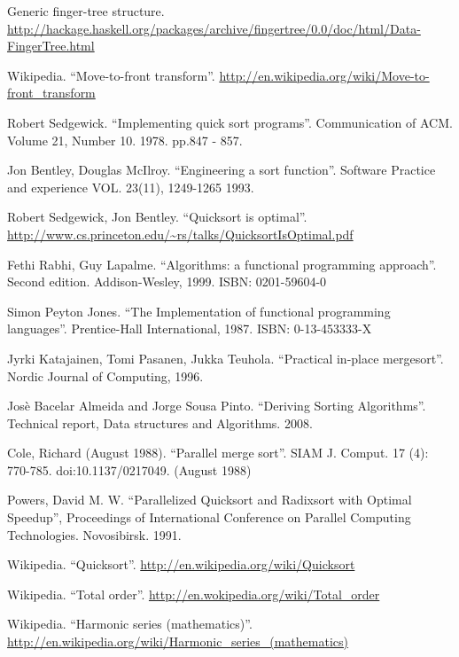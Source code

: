 \documentclass[b5paper]{ctexart}
\begin{document}
\begin{thebibliography}{99}
Generic finger-tree structure. \url{http://hackage.haskell.org/packages/archive/fingertree/0.0/doc/html/Data-FingerTree.html}

Wikipedia. ``Move-to-front transform''. \url{http://en.wikipedia.org/wiki/Move-to-front_transform}


Robert Sedgewick. ``Implementing quick sort programs''. Communication of ACM. Volume 21, Number 10. 1978. pp.847 - 857.

Jon Bentley, Douglas McIlroy. ``Engineering a sort function''. Software Practice and experience VOL. 23(11), 1249-1265 1993.

Robert Sedgewick, Jon Bentley. ``Quicksort is optimal''. \url{http://www.cs.princeton.edu/~rs/talks/QuicksortIsOptimal.pdf}

Fethi Rabhi, Guy Lapalme. ``Algorithms: a functional programming approach''. Second edition. Addison-Wesley, 1999. ISBN: 0201-59604-0

Simon Peyton Jones. ``The Implementation of functional programming languages''. Prentice-Hall International, 1987. ISBN: 0-13-453333-X

Jyrki Katajainen, Tomi Pasanen, Jukka Teuhola. ``Practical in-place mergesort''. Nordic Journal of Computing, 1996.

Jos\`{e} Bacelar Almeida and Jorge Sousa Pinto. ``Deriving Sorting Algorithms''. Technical report, Data structures and Algorithms. 2008.

Cole, Richard (August 1988). ``Parallel merge sort''. SIAM J. Comput. 17 (4): 770-785. doi:10.1137/0217049. (August 1988)

Powers, David M. W. ``Parallelized Quicksort and Radixsort with Optimal Speedup'', Proceedings of International Conference on Parallel Computing Technologies. Novosibirsk. 1991.

Wikipedia. ``Quicksort''. \url{http://en.wikipedia.org/wiki/Quicksort}

Wikipedia. ``Total order''. \url{http://en.wokipedia.org/wiki/Total_order}

Wikipedia. ``Harmonic series (mathematics)''. \url{http://en.wikipedia.org/wiki/Harmonic_series_(mathematics)}


\end{thebibliography}
\end{document}
